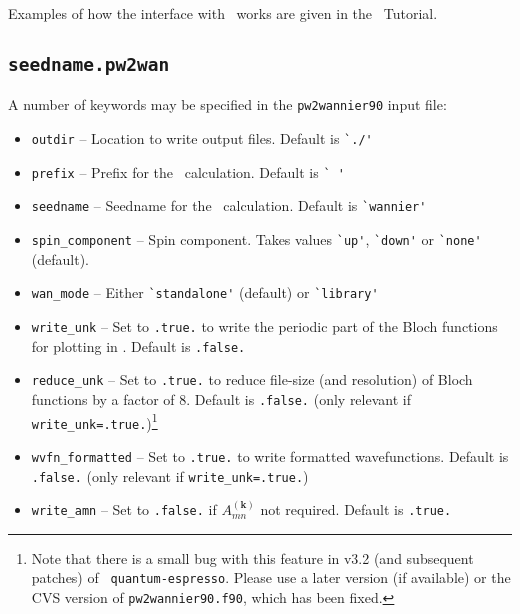 Examples of how the interface with \pwscf\ works are given in the
\wannier\ Tutorial. 

\subsection{{\tt seedname.pw2wan}}

A number of keywords may be specified in the {\tt pw2wannier90} input file:


\begin{itemize}

\item   \verb#outdir# -- Location to write output files. Default is \verb#`./'#

\item   \verb#prefix# -- Prefix for the \pwscf\ calculation. Default is \verb#` '#

\item   \verb#seedname# -- Seedname for the \wannier\ calculation. Default
   is \verb#`wannier'#

\item   \verb#spin_component# -- Spin component. Takes values \verb#`up'#,
   \verb#`down'# or \verb#`none'# (default).

\item   \verb#wan_mode# -- Either \verb#`standalone'# (default) or \verb#`library'#

\item   \verb#write_unk# -- Set to \verb#.true.# to write the periodic part
   of the Bloch functions for plotting in \wannier. Default is
   \verb#.false.#

\item   \verb#reduce_unk# -- Set to \verb#.true.# to reduce file-size (and
   resolution) of Bloch functions by a factor of 8. Default is
   \verb#.false.# (only relevant if
   \verb#write_unk=.true.#)\footnote{Note that there is a small bug
   with this feature in v3.2 (and subsequent patches) of {\tt
   quantum-espresso}. Please use a later version (if available) or the
   CVS version of {\tt pw2wannier90.f90}, which has been fixed.}

\item   \verb#wvfn_formatted# -- Set to \verb#.true.# to write formatted
   wavefunctions. Default is \verb#.false.# (only relevant if
   \verb#write_unk=.true.#)

\item   \verb#write_amn# -- Set to \verb#.false.# if
   $A_{mn}^{(\mathbf{k})}$ not required. Default is \verb#.true.#


\end{itemize}
